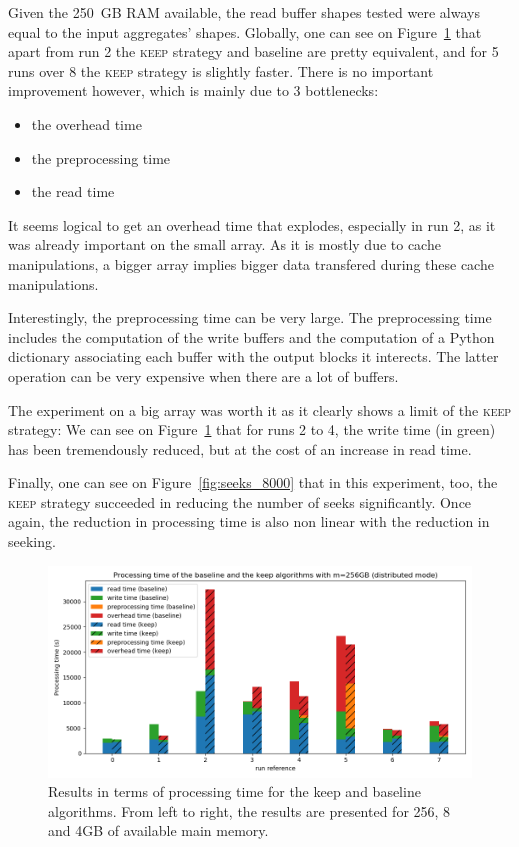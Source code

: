 \documentclass[sigconf, nonacm]{acmart}
\newcommand{\keep}[0]{\textsc{keep}\xspace}
\begin{document}
Given the 250~GB RAM available, the read buffer shapes tested were always equal to
the input aggregates' shapes.
Globally, one can see on Figure~\ref{fig:time_8000} that apart from run 2 the \keep
strategy and baseline are pretty equivalent, and for 5 runs over 8 the \keep
strategy is slightly faster.
There is no important improvement however, which is mainly due to 3 bottlenecks:
\begin{itemize}
  \item the overhead time
  \item the preprocessing time
  \item the read time
\end{itemize}

It seems logical to get an overhead time that explodes, especially in run 2, as
it was already important on the small array. As it is mostly due to cache manipulations,
a bigger array implies bigger data transfered during these cache manipulations.

Interestingly, the preprocessing time can be very large.
The preprocessing time includes the computation of the write buffers and the
computation of a Python dictionary associating each buffer with the output blocks
it interects. The latter operation can be very expensive when there are a lot
of buffers.

The experiment on a big array was worth it as it clearly shows a limit
of the \keep strategy: We can see on Figure~\ref{fig:time_8000} that for runs
2 to 4, the write time (in green) has been tremendously reduced, but at the
cost of an increase in read time.

Finally, one can see on Figure~\ref{fig:seeks_8000} that in this experiment, too,
the \keep strategy succeeded in reducing the number of seeks significantly. Once
again, the reduction in processing time is also non linear with the reduction in
seeking.

\begin{figure}[h]
  \centering
  \includegraphics[scale=0.36]{./figures/time_8000.png}
  \caption{Results in terms of processing time for the keep and baseline algorithms. From left to right, the results are presented for 256, 8 and 4GB of available main memory.}
  \label{fig:time_8000}
\end{figure}
\end{document}
